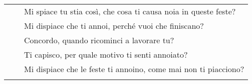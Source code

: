 \begin{table}[!htbp]
\begin{tabularx}{\linewidth}{ l|X | X  }
        && Mi spiace tu stia così, che cosa ti causa noia in queste feste?\\
 [2em]
        && Mi dispiace che ti annoi, perché vuoi che finiscano?\\     
 [1em]
        && Concordo, quando ricominci a lavorare tu?\\      
 [1em]
        && Ti capisco, per quale motivo ti senti annoiato?\\      
 [1em]
        && Mi dispiace che le feste ti annoino, come mai non ti piacciono?\\
       \arrayrulecolor{black}
        \bottomrule

    \end{tabularx}
\end{table}
